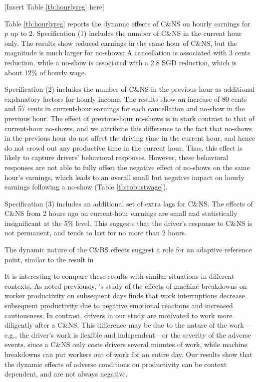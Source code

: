 \documentclass[reviewmode,AEJ]{AEA}
\begin{document}
\begin{center}
	[Insert Table \ref{tb:hourlyreg} here]
\end{center}

Table \ref{tb:hourlyreg} reports the dynamic effects of C\&NS on hourly earnings for $p$ up to 2. 
Specification (1) includes the number of C\&NS in the current hour only. The results show reduced 
earnings in the same hour of C\&NS, but the magnitude is much larger for no-shows: A cancellation is 
associated with 3 cents reduction, while a no-show is associated with a 2.8 SGD reduction, which is 
about 12\% of hourly wage. 

Specification (2) includes the number of C\&NS in the previous hour as additional explanatory factors 
for hourly income. The results show an increase of 80 cents and 57 cents in current-hour earnings for 
each cancellation and no-show in the previous hour. The effect of previous-hour no-shows is in stark
contrast to that of current-hour no-shows, and we attribute this difference to the fact that no-shows 
in the previous hour do not affect the driving time in the current hour, and hence do not crowd out any
productive time in the current hour. Thus, this effect is likely to capture drivers' behavioral responses. 
However, these behavioral responses are not able to fully offset the negative effect of no-shows on the
same hour's earnings, which leads to an overall small but negative impact on hourly earnings following
a no-show (Table \ref{tb:robustwage}).

Specification (3) includes an additional set of extra lags for C\&NS. The effects of C\&NS from 2 hours
ago on current-hour earnings are small and statistically insignificant at the 5\% level. This suggests
that the driver's response to C\&NS is not permanent, and tends to last for no more than 2 hours. 

The dynamic nature of the C\&BS effects suggest a role for an adaptive reference point, similar to the result in \citet{thakral2018daily}

It is interesting to compare these results with similar situations in different contexts. As noted previously,
\citeauthor{cai2017recover}'s \citeyear{cai2017recover} study of the effects of  machine breakdowns on worker 
productivity on subsequent days finds that work interruptions decrease subsequent productivity due to
negative emotional reactions and increased cautiousness. In contrast, drivers in our study are motivated 
to work more diligently after a C\&NS. This difference may be due to the nature of the work---e.g., the 
driver's work is flexible and independent---or the severity of the adverse events, since a C\&NS only costs
drivers several minutes of work, while machine breakdowns can put workers out of work for an entire day.
Our results show that the dynamic effects of adverse conditions on productivity can be context dependent,
and are not always negative.
\end{document}
